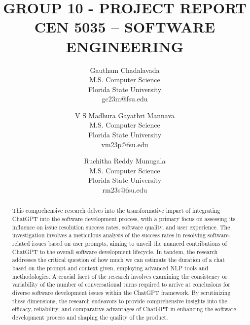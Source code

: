 \documentclass[journal]{IEEEtran}
\begin{document}
\title{GROUP 10 - PROJECT REPORT \\
CEN 5035 – SOFTWARE ENGINEERING}

\author{
  \begin{tabular}{c}
    Gautham Chadalavada \\
    M.S. Computer Science \\
    Florida State University \\
    gc23m@fsu.edu
  \end{tabular}
  \and
  \begin{tabular}{c}
    V S Madhura Gayathri Mannava \\
    M.S. Computer Science \\
    Florida State University \\
    vm23p@fsu.edu
  \end{tabular}
  \and
  \begin{tabular}{c}
    Ruchitha Reddy Munugala \\
    M.S. Computer Science \\
    Florida State University \\
    rm23s@fsu.edu
  \end{tabular}
}





\maketitle

\begin{abstract}
This comprehensive research delves into the transformative impact of integrating ChatGPT into the software development process, with a primary focus on assessing its influence on issue resolution success rates, software quality, and user experience. The investigation involves a meticulous analysis of the success rates in resolving software-related issues based on user prompts, aiming to unveil the nuanced contributions of ChatGPT to the overall software development lifecycle. In tandem, the research addresses the critical question of how much we can estimate the duration of a chat based on the prompt and context given, employing advanced NLP tools and methodologies. A crucial facet of the research involves examining the consistency or variability of the number of conversational turns required to arrive at conclusions for diverse software development issues within the ChatGPT framework. By scrutinizing these dimensions, the research endeavors to provide comprehensive insights into the efficacy, reliability, and comparative advantages of ChatGPT in enhancing the software development process and shaping the quality of the product.
\end{abstract}
\end{document}
